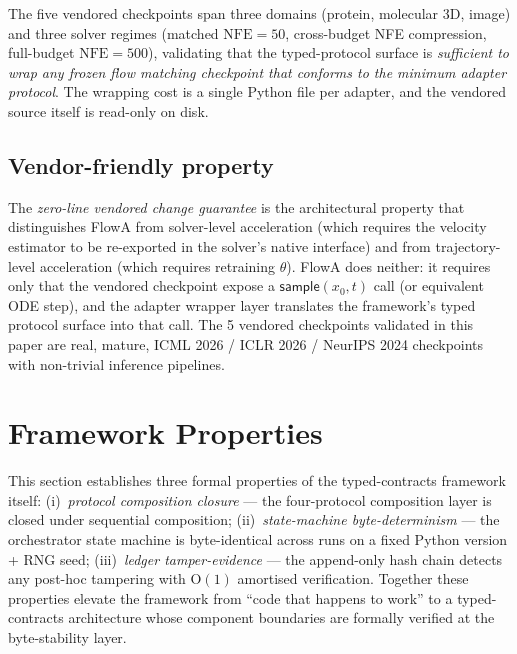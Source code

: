 \documentclass[journal,twocolumn,final]{IEEEtran}
\newcommand{\NFE}{\mathrm{NFE}}
\begin{document}
The five vendored checkpoints span three domains (protein, molecular 3D,
image) and three solver regimes (matched $\NFE = 50$, cross-budget NFE
compression, full-budget $\NFE = 500$), validating that the typed-protocol
surface is \emph{sufficient to wrap any frozen flow matching checkpoint that
conforms to the minimum adapter protocol}. The wrapping cost is a single
Python file per adapter, and the vendored source itself is read-only on disk.

\subsection{Vendor-friendly property}

The \emph{zero-line vendored change guarantee} is the architectural property
that distinguishes FlowA from solver-level acceleration (which requires the
velocity estimator to be re-exported in the solver's native interface) and
from trajectory-level acceleration (which requires retraining $\theta$).
FlowA does neither: it requires only that the vendored checkpoint expose a
$\mathsf{sample}(x_0, t)$ call (or equivalent ODE step), and the adapter
wrapper layer translates the framework's typed protocol surface into that
call. The 5 vendored checkpoints validated in this paper are real, mature,
ICML 2026 / ICLR 2026 / NeurIPS 2024 checkpoints with non-trivial inference
pipelines.

\section{Framework Properties}\label{sec:frameworkprops}

This section establishes three formal properties of the typed-contracts
framework itself: (i)~\emph{protocol composition closure} --- the four-protocol
composition layer is closed under sequential composition; (ii)~\emph{state-machine
byte-determinism} --- the orchestrator state machine is byte-identical across
runs on a fixed Python version + RNG seed; (iii)~\emph{ledger
tamper-evidence} --- the append-only hash chain detects any post-hoc tampering
with $\mathrm{O}(1)$ amortised verification. Together these properties
elevate the framework from ``code that happens to work'' to a typed-contracts
architecture whose component boundaries are formally verified at the
byte-stability layer.
\end{document}
